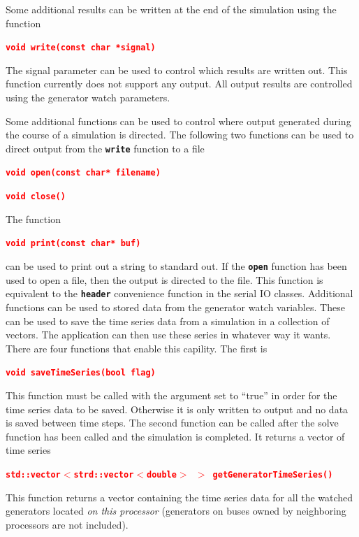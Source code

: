 \documentclass[12pt]{report} %
\begin{document}
Some additional results can be written at the end of the simulation using the function

\textcolor{red}{\texttt{\textbf{void write(const char *signal)}}}

The signal parameter can be used to control which results are written out. This function currently does not support any output. All output results are controlled using the generator watch parameters.

Some additional functions can be used to control where output generated during the course of a simulation is directed. The following two functions can be used to direct output from the \texttt{\textbf{write}} function to a file

\textcolor{red}{\texttt{\textbf{void open(const char* filename)}}}

\textcolor{red}{\texttt{\textbf{void close()}}}

The function

\textcolor{red}{\texttt{\textbf{void print(const char* buf)}}}

can be used to print out a string to standard out. If the \texttt{\textbf{open}} function has been used to open a file, then the output is directed to the file. This function is equivalent to the \texttt{\textbf{header}} convenience function in the serial IO classes.
Additional functions can be used to stored data from the generator watch variables. These can be used to save the time series data from a simulation in a collection of vectors. The application can then use these series in whatever way it wants. There are four functions that enable this capility. The first is

\textcolor{red}{\texttt{\textbf{void saveTimeSeries(bool flag)}}}

This function must be called with the argument set to ``true'' in order for the time series data to be saved. Otherwise it is only written to output and no data is saved between time steps. The second function can be called after the solve function has been called and the simulation is completed. It returns a vector of time series

\textcolor{red}{\texttt{\textbf{std::vector$\boldsymbol{\mathrm{<}}$strd::vector$\boldsymbol{\mathrm{<}}$double$\boldsymbol{\mathrm{>}}$ $\boldsymbol{\mathrm{>}}$ getGeneratorTimeSeries()}}}

This function returns a vector containing the time series data for all the watched generators located \textit{on this processor} (generators on buses owned by neighboring processors are not included).
\end{document}
